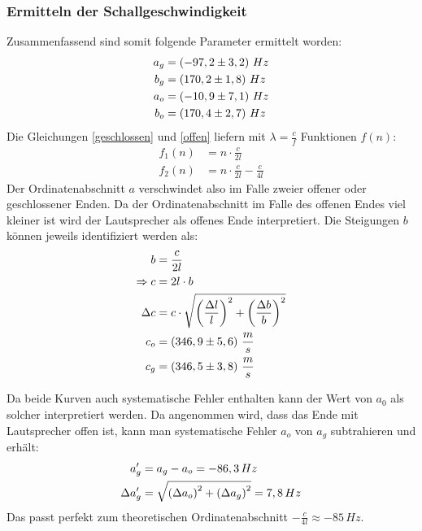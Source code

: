 \subsubsection{Ermitteln der Schallgeschwindigkeit}
Zusammenfassend sind somit folgende Parameter ermittelt worden:
\begin{align}
a_g &= \left( -97,2 \pm 3,2 \right)\, Hz \notag \\ 
b_g &= \left( 170,2 \pm 1,8 \right)\, Hz \notag \\
a_o &= \left( -10,9 \pm 7,1 \right)\, Hz \notag \\ 
b_o &= \left( 170,4 \pm 2,7 \right)\, Hz \notag
\end{align}
Die Gleichungen \eqref{geschlossen} und \eqref{offen} liefern mit \(\lambda = \frac{c}{f}\) Funktionen \(f(n)\):
\begin{align}
f_1(n) &= n \cdot \frac{c}{2l} \\
f_2(n) &= n \cdot \frac{c}{2l} - \frac{c}{4l}
\end{align}
Der Ordinatenabschnitt  \(a\) verschwindet also im Falle zweier offener oder geschlossener Enden. Da der Ordinatenabschnitt im Falle des offenen Endes viel kleiner ist wird der Lautsprecher als offenes Ende interpretiert.
Die Steigungen \(b\) können jeweils identifiziert werden als:
\begin{align}
b &= \frac{c}{2l}\\
\Rightarrow c &= 2l \cdot b \\
\Delta c &= c\cdot \sqrt{\left( \frac{\Delta l}{l} \right)^2+\left( \frac{\Delta b}{b} \right)^2} \\
c_o &= \left(346,9 \pm 5,6 \right)\, \frac{m}{s} \notag \\
c_g &= \left(346,5 \pm 3,8 \right)\, \frac{m}{s} \notag
\end{align}

Da beide Kurven auch systematische Fehler enthalten kann der Wert von \(a_0\) als solcher interpretiert werden. Da angenommen wird, dass das Ende mit Lautsprecher offen ist, kann man  systematische Fehler \(a_o\) von \(a_g\) subtrahieren und erhält:
\begin{align}
a_g' &= a_g - a_o = -86,3\, Hz \notag \\
\Delta a_g' &= \sqrt{\left(\Delta a_o\right)^2 + \left(\Delta a_g\right)^2} = 7,8\, Hz \notag
\end{align}
Das passt perfekt zum theoretischen Ordinatenabschnitt \(-\frac{c}{4l} \approx - 85\, Hz\).

